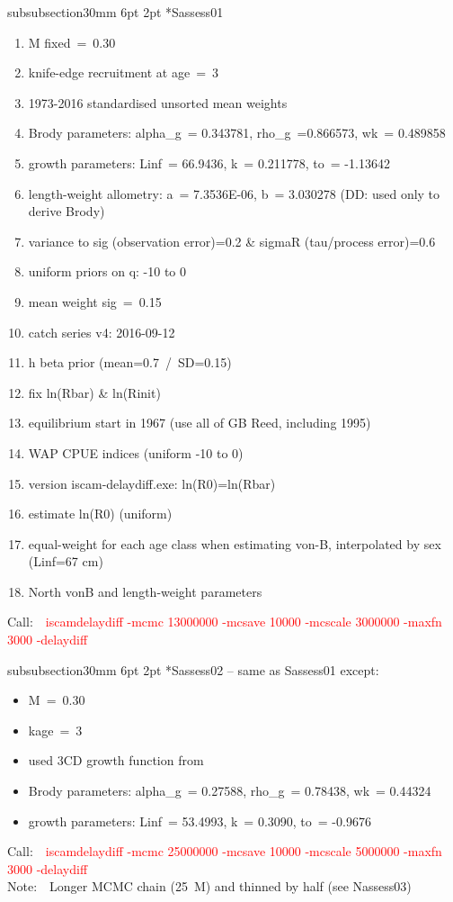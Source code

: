 \documentclass[11pt]{book}
\makeatletter
\newcommand{\red}[1]{{\textcolor{red} {#1}}}
\newcommand{\notecol}[1]{{\textcolor{notecol} {#1}}}
\renewcommand{\subsubsection}{\@startsection%
{subsubsection}{3}{0mm}%
{6pt \@plus -0pt \@minus -0pt}{2pt \@plus 0pt}%
{\normalfont\bf}}%
\newcommand\call[1]{
\footnotesize\selectfont\hangindent=0.35in
Call:~~\red{#1}
\normalsize\selectfont}
\newcommand\note[1]{
\footnotesize\selectfont\hangindent=0.35in
Note:~~\notecol{#1}
\normalsize\selectfont}
\makeatother
\begin{document}
\subsubsection*{Sassess01}
\begin{enumerate}[nosep]
  \item M fixed~=~0.30
  \item knife-edge recruitment at age~=~3
  \item 1973-2016 standardised unsorted mean weights
  \item Brody parameters: alpha\_g~= 0.343781, rho\_g~=0.866573, wk~= 0.489858
  \item growth parameters: Linf~= 66.9436, k~= 0.211778, to~= -1.13642
  \item length-weight allometry: a~= 7.3536E-06, b~= 3.030278  (DD: used only to derive Brody)
  \item variance to sig (observation error)=0.2 \& sigmaR (tau/process error)=0.6
  \item uniform priors on q: -10 to 0
  \item mean weight sig~=~0.15
  \item catch series v4: 2016-09-12
  \item h beta prior (mean=0.7~/~SD=0.15)
  \item fix ln(Rbar) \& ln(Rinit)
  \item equilibrium start in 1967 (use all of GB Reed, including 1995)
  \item WAP CPUE indices (uniform -10 to 0)
  \item version iscam-delaydiff.exe: ln(R0)=ln(Rbar)
  \item estimate ln(R0) (uniform)
  \item equal-weight for each age class when estimating von-B, interpolated by sex (Linf=67 cm)
  \item North vonB and length-weight parameters
\end{enumerate}
\call{iscamdelaydiff -mcmc 13000000 -mcsave 10000 -mcscale 3000000 -maxfn 3000 -delaydiff}

\subsubsection*{Sassess02 -- same as Sassess01 except:}
\begin{itemize}[nosep]
  \item M~=~0.30
  \item kage~=~3
  \item used 3CD growth function from \citet{Saunders-etal:1989}
  \item Brody parameters: alpha\_g~= 0.27588, rho\_g~= 0.78438, wk~= 0.44324
  \item growth parameters: Linf~= 53.4993, k~= 0.3090, to~= -0.9676
\end{itemize}
\call{iscamdelaydiff -mcmc 25000000 -mcsave 10000 -mcscale 5000000 -maxfn 3000 -delaydiff}\\
\note{Longer MCMC chain (25~M) and thinned by half (see Nassess03)}
\end{document}
